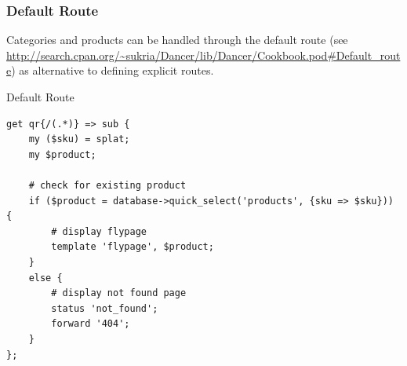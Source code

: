 \subsubsection{Default Route}
Categories and products can be handled through the default route
(see
\url{http://search.cpan.org/~sukria/Dancer/lib/Dancer/Cookbook.pod#Default_route})
as alternative to defining explicit routes.

\begin{frame}[fragile]{Default Route}
\begin{lstlisting}
get qr{/(.*)} => sub {
    my ($sku) = splat;
    my $product;

    # check for existing product
    if ($product = database->quick_select('products', {sku => $sku})) {
        # display flypage
        template 'flypage', $product;
    }
    else {
        # display not found page
        status 'not_found';
        forward '404';
    }
};
\end{lstlisting}
\end{frame}



